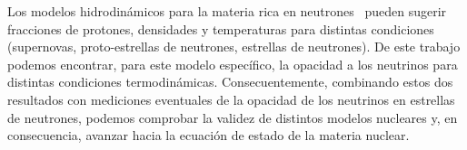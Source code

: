 Los modelos hidrodinámicos para la materia rica en neutrones~\cite{ruffert_coalescing_1995, mezzacappa_investigation_1998, geppert_temperature_2004, woosley_physics_2005, liebendorfer_supernova_2005} pueden sugerir fracciones de protones, densidades y temperaturas para distintas condiciones (supernovas, proto-estrellas de neutrones, estrellas de neutrones).
De este trabajo podemos encontrar, para este modelo específico, la opacidad a los neutrinos para distintas condiciones termodinámicas.
Consecuentemente, combinando estos dos resultados con mediciones eventuales de la opacidad de los neutrinos en estrellas de neutrones, podemos comprobar la validez de distintos modelos nucleares y, en consecuencia, avanzar hacia la ecuación de estado de la materia nuclear.

